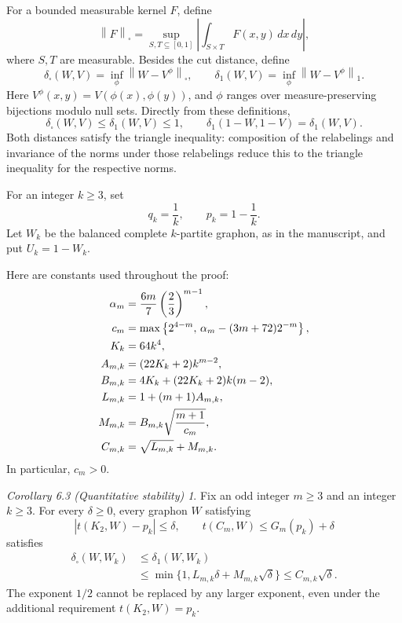 \documentclass[11pt]{article}
\theoremstyle{remark}
\newtheorem*{replacement}{Corollary 6.3 (Quantitative stability)}
\newcommand{\dsq}{\delta_{\square}}
\newcommand{\norm}[1]{\left\lVert #1\right\rVert}
\newcommand{\abs}[1]{\left\lvert #1\right\rvert}
\begin{document}
For a bounded measurable kernel $F$, define
\[
 \norm{F}_{\square}
 =\sup_{S,T\subseteq[0,1]}
   \abs{\int_{S\times T}F(x,y)\,dx\,dy},
\]
where $S,T$ are measurable. Besides the cut distance, define
\[
 \dsq(W,V)=\inf_\phi\norm{W-V^\phi}_{\square},
 \qquad
 \delta_1(W,V)=\inf_\phi\norm{W-V^\phi}_1.
\]
Here $V^\phi(x,y)=V(\phi(x),\phi(y))$, and $\phi$ ranges over
measure-preserving bijections modulo null sets. Directly from these
definitions,
\begin{equation}\label{eq:distance-basics}
 \dsq(W,V)\leq\delta_1(W,V)\leq1,
 \qquad
 \delta_1(1-W,1-V)=\delta_1(W,V).
\end{equation}
Both distances satisfy the triangle inequality: composition of the
relabelings and invariance of the norms under those relabelings reduce
this to the triangle inequality for the respective norms.

For an integer $k\geq3$, set
\[
 q_k=\frac1k,\qquad p_k=1-\frac1k.
\]
Let $W_k$ be the balanced complete $k$-partite graphon, as in the
manuscript, and put $U_k=1-W_k$.

Here are constants used throughout the proof:
\begin{align}
 \alpha_m&=\frac{6m}{7}\left(\frac23\right)^{m-1},\notag\\
 c_m&=\max\left\{2^{4-m},\,
        \alpha_m-(3m+72)2^{-m}\right\},\label{eq:c}\\
 K_k&=64k^4,\label{eq:K}\\
 A_{m,k}&=(22K_k+2)k^{m-2},\label{eq:A}\\
 B_{m,k}&=4K_k+(22K_k+2)k(m-2),\label{eq:B}\\
 L_{m,k}&=1+(m+1)A_{m,k},\label{eq:L}\\
 M_{m,k}&=B_{m,k}\sqrt{\frac{m+1}{c_m}},\label{eq:M}\\
 C_{m,k}&=\sqrt{L_{m,k}}+M_{m,k}.\label{eq:C}
\end{align}
In particular, $c_m>0$.

\begin{replacement}
Fix an odd integer $m\geq3$ and an integer $k\geq3$.
For every $\delta\geq0$, every graphon $W$ satisfying
\begin{equation}\label{eq:hypotheses}
 \abs{t(K_2,W)-p_k}\leq\delta,
 \qquad t(C_m,W)\leq G_m(p_k)+\delta
\end{equation}
satisfies
\begin{equation}\label{eq:main}
 \begin{split}
 \dsq(W,W_k)&\leq\delta_1(W,W_k)\\
 &\leq\min\{1,L_{m,k}\delta+M_{m,k}\sqrt{\delta}\}
 \leq C_{m,k}\sqrt{\delta}.
 \end{split}
\end{equation}
The exponent $1/2$ cannot be replaced by any larger exponent, even
under the additional requirement $t(K_2,W)=p_k$.
\end{replacement}
\end{document}
